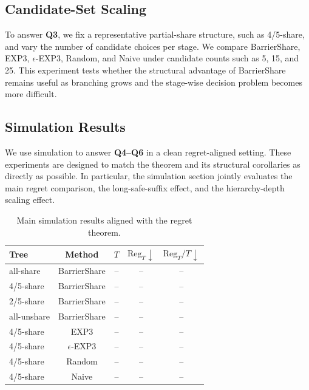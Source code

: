 \documentclass{article}
\begin{document}
\subsection{Candidate-Set Scaling}

To answer \textbf{Q3}, we fix a representative partial-share structure, such as 4/5-share, and vary the number of candidate choices per stage. We compare BarrierShare, EXP3, $\epsilon$-EXP3, Random, and Naive under candidate counts such as 5, 15, and 25. This experiment tests whether the structural advantage of BarrierShare remains useful as branching grows and the stage-wise decision problem becomes more difficult.

\subsection{Simulation Results}

We use simulation to answer \textbf{Q4--Q6} in a clean regret-aligned setting. These experiments are designed to match the theorem and its structural corollaries as directly as possible. In particular, the simulation section jointly evaluates the main regret comparison, the long-safe-suffix effect, and the hierarchy-depth scaling effect.

\begin{table}[t]
    \centering
    \small
    \caption{Main simulation results aligned with the regret theorem.}
    \label{tab:sim_main}
    \begin{tabular}{lcccc}
        \toprule
        Tree & Method & $T$ & $\mathrm{Reg}_T \downarrow$ & $\mathrm{Reg}_T/T \downarrow$ \\
        \midrule
        all-share & BarrierShare & -- & -- & -- \\
        4/5-share & BarrierShare & -- & -- & -- \\
        2/5-share & BarrierShare & -- & -- & -- \\
        all-unshare & BarrierShare & -- & -- & -- \\
        4/5-share & EXP3 & -- & -- & -- \\
        4/5-share & $\epsilon$-EXP3 & -- & -- & -- \\
        4/5-share & Random & -- & -- & -- \\
        4/5-share & Naive & -- & -- & -- \\
        \bottomrule
    \end{tabular}
\end{table}
\end{document}
